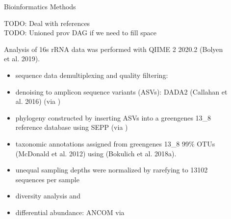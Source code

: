 \documentclass[final]{beamer}
\newlength{\sepwidth}
\newlength{\colwidth}
\newcommand{\separatorcolumn}{\begin{column}{\sepwidth}\end{column}}
\begin{document}
\begin{frame}[t]
\begin{columns}[t]
\begin{column}{\colwidth}
  \begin{block}{Bioinformatics Methods}

    TODO: Deal with references \\
    TODO: Unioned prov DAG if we need to fill space

    Analysis of 16s rRNA data was performed with QIIME 2 2020.2 (Bolyen et al. 2019).
    \begin{itemize}
      \item {sequence data demultiplexing and quality filtering: }
      \item {denoising to amplicon sequence variants (ASVs): DADA2 (Callahan et al. 2016) (via )}
      \item {phylogeny constructed by inserting ASVs into a greengenes 13\_8 reference database using SEPP (via )}
      \item {taxonomic annotations assigned from greengenes 13\_8 99\% OTUs (McDonald et al. 2012) using  (Bokulich et al. 2018a).}
      \item {unequal sampling depths were normalized by rarefying to 13102 sequences per sample}
      \item {diversity analysis   and }
      \item {differential abundance: ANCOM via }
    \end{itemize}

  \end{block}

\end{column}

\separatorcolumn

\begin{column}{\colwidth}


\end{column}
\end{columns}
\end{frame}
\end{document}

